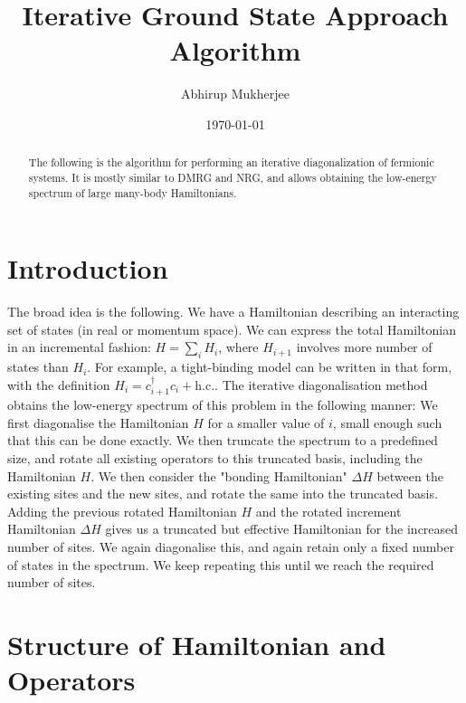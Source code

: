 \documentclass[reprint]{revtex4-2}
\begin{document}
\title{Iterative Ground State Approach Algorithm}
\author{Abhirup Mukherjee}
\begin{abstract}
	The following is the algorithm for performing an iterative diagonalization of fermionic systems. It is mostly similar to DMRG and NRG, and allows obtaining the low-energy spectrum of large many-body Hamiltonians.
\end{abstract}
\date{\today}
\maketitle

\section{Introduction}
The broad idea is the following. We have a Hamiltonian describing an interacting set of states (in real or momentum space). We can express the total Hamiltonian in an incremental fashion: \(H = \sum_i H_i\), where \(H_{i+1}\) involves more number of states than \(H_i\). For example, a tight-binding model can be written in that form, with the definition \(H_i = c^\dagger_{i+1}c_i + \text{h.c.}\). The iterative diagonalisation method obtains the low-energy spectrum of this problem in the following manner: We first diagonalise the Hamiltonian \(H\) for a smaller value of \(i\), small enough such that this can be done exactly. We then truncate the spectrum to a predefined size, and rotate all existing operators to this truncated basis, including the Hamiltonian \(H\). We then consider the "bonding Hamiltonian" \(\Delta H\) between the existing sites and the new sites, and rotate the same into the truncated basis. Adding the previous rotated Hamiltonian \(H\) and the rotated increment Hamiltonian \(\Delta H\) gives us a truncated but effective Hamiltonian for the increased number of sites. We again diagonalise this, and again retain only a fixed number of states in the spectrum. We keep repeating this until we reach the required number of sites.


\section{Structure of Hamiltonian and Operators}
\end{document}
